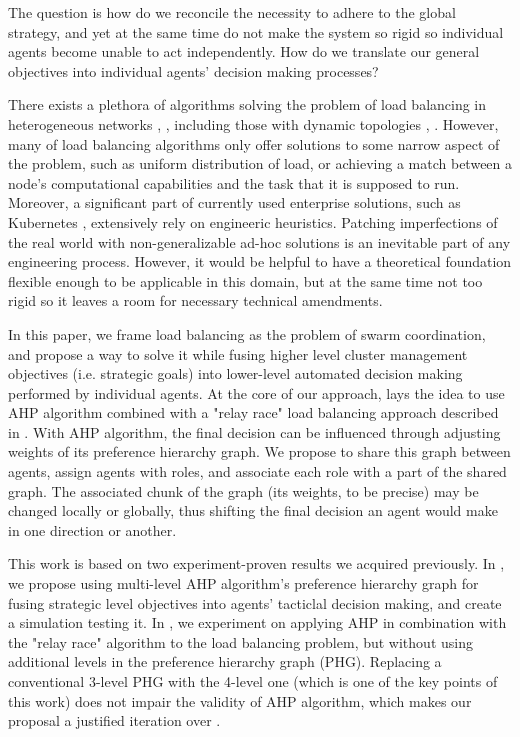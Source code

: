 The question is how do we reconcile the necessity to adhere to the global strategy, and yet at the same time do not make
the system so rigid so individual agents become unable to act independently.
How do we translate our general objectives into individual agents' decision making processes?

There exists a plethora of algorithms solving the problem of load balancing in heterogeneous networks \cite{gamal-2019}, \cite{adhikari-2018}, including those with dynamic topologies \cite{sahoo-2020}, \cite{zhang-2018}.
However, many of load balancing algorithms only offer solutions to some narrow aspect of the problem, such as uniform distribution of load, or achieving a match between a node's computational capabilities and the task that it is supposed to run.
Moreover, a significant part of currently used enterprise solutions, such as Kubernetes \cite{kubernet17}, extensively rely on engineeric heuristics.
Patching imperfections of the real world with non-generalizable ad-hoc solutions is an inevitable part of any engineering process.
However, it would be helpful to have a theoretical foundation flexible enough to be applicable in this domain, but at the same time not too rigid so it leaves a room for necessary technical amendments.

In this paper, we frame load balancing as the problem of swarm coordination, and propose a way to solve it while fusing higher level cluster management objectives (i.e. strategic goals) into lower-level automated decision making performed by individual agents.
At the core of our approach, lays the idea to use AHP \cite{saaty-2008} algorithm combined with a "relay race" load balancing approach described in \cite{gorodetskii-2012}.
With AHP algorithm, the final decision can be influenced through adjusting weights of its preference hierarchy graph.
We propose to share this graph between agents, assign agents with roles, and associate each role with a part of the shared graph.
The associated chunk of the graph (its weights, to be precise) may be changed locally or globally, thus shifting the final decision an agent would make in one direction or another.

This work is based on two experiment-proven results we acquired previously.
In \cite{murashov-2021}, we propose using multi-level AHP algorithm's preference hierarchy graph for fusing strategic level objectives into agents' tacticlal decision making, and create a simulation testing it.
In \cite{murashov-2022}, we experiment on applying AHP in combination with the "relay race" algorithm to the load balancing problem, but without using additional levels in the preference hierarchy graph (PHG).
Replacing a conventional 3-level PHG with the 4-level one (which is one of the key points of this work) does not impair the validity of AHP algorithm, which makes our proposal a justified iteration over \cite{murashov-2022}.

